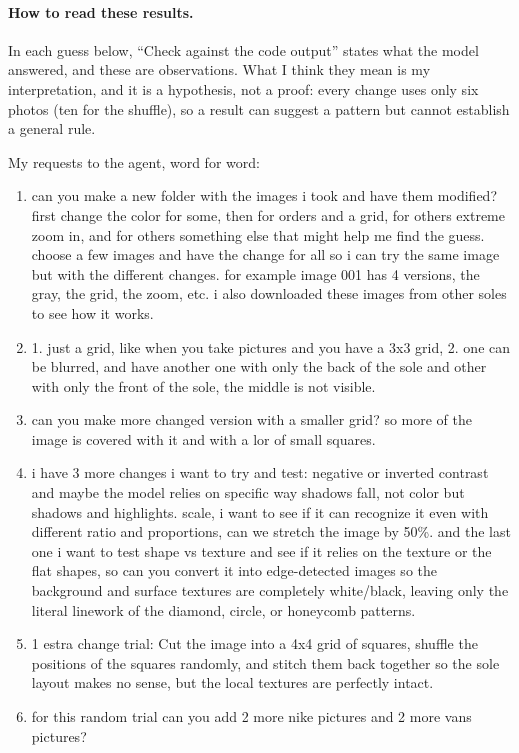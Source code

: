 \documentclass[11pt]{article}
\begin{document}
\paragraph{How to read these results.} In each guess below, ``Check against the code output'' states what the model answered, and these are observations. What I think they mean is my interpretation, and it is a hypothesis, not a proof: every change uses only six photos (ten for the shuffle), so a result can suggest a pattern but cannot establish a general rule.

My requests to the agent, word for word:
\begin{enumerate}
  \item can you make a new folder with the images i took and have them modified? first change the color for some, then for orders and a grid, for others extreme zoom in, and for others something else that might help me find the guess. choose a few images and have the change for all so i can try the same image but with the different changes. for example image 001 has 4 versions, the gray, the grid, the zoom, etc. i also downloaded these images from other soles to see how it works.
  \item 1. just a grid, like when you take pictures and you have a 3x3 grid, 2. one can be blurred, and have another one with only the back of the sole and other with only the front of the sole, the middle is not visible.
  \item can you make more changed version with a smaller grid? so more of the image is covered with it and with a lor of small squares.
  \item i have 3 more changes i want to try and test: negative or inverted contrast and maybe the model relies on specific way shadows fall, not color but shadows and highlights. scale, i want to see if it can recognize it even with different ratio and proportions, can we stretch the image by 50\%. and the last one i want to test shape vs texture and see if it relies on the texture or the flat shapes, so can you convert it into edge-detected images so the background and surface textures are completely white/black, leaving only the literal linework of the diamond, circle, or honeycomb patterns.
  \item 1 estra change trial: Cut the image into a 4x4 grid of squares, shuffle the positions of the squares randomly, and stitch them back together so the sole layout makes no sense, but the local textures are perfectly intact.
  \item for this random trial can you add 2 more nike pictures and 2 more vans pictures?
\end{enumerate}
\end{document}
